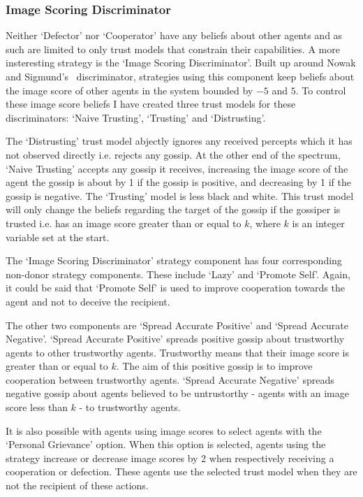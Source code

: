 \documentclass[]{final_report}
\begin{document}
\subsubsection{Image Scoring Discriminator}
Neither `Defector' nor `Cooperator' have any beliefs about other agents and as such are limited to only trust models that constrain their capabilities. A more insteresting strategy is the `Image Scoring Discriminator'. Built up around Nowak and Sigmund's~\cite{evol_indirect_image} discriminator, strategies using this component keep beliefs about the image score of other agents in the system bounded by $-5$ and $5$. To control these image score beliefs I have created three trust models for these discriminators: `Naive Trusting', `Trusting' and `Distrusting'.\par
The `Distrusting' trust model abjectly ignores any received percepts which it has not observed directly i.e. rejects any gossip. At the other end of the spectrum, `Naive Trusting' accepts any gossip it receives, increasing the image score of the agent the gossip is about by 1 if the gossip is positive, and decreasing by 1 if the gossip is negative. The `Trusting' model is less black and white. This trust model will only change the beliefs regarding the target of the gossip if the gossiper is trusted i.e. has an image score greater than or equal to $k$, where $k$ is an integer variable set at the start.\par
The `Image Scoring Discriminator' strategy component has four corresponding non-donor strategy components. These include `Lazy' and `Promote Self'. Again, it could be said that `Promote Self' is used to improve cooperation towards the agent and not to deceive the recipient.\par
The other two components are `Spread Accurate Positive' and `Spread Accurate Negative'. `Spread Accurate Positive' spreads positive gossip about trustworthy agents to other trustworthy agents. Trustworthy means that their image score is greater than or equal to $k$. The aim of this positive gossip is to improve cooperation between trustworthy agents. `Spread Accurate Negative' spreads negative gossip about agents believed to be untrustorthy - agents with an image score less than $k$ - to trustworthy agents.\par 
It is also possible with agents using image scores to select agents with the `Personal Grievance' option. When this option is selected, agents using the strategy increase or decrease image scores by 2 when respectively receiving a cooperation or defection. These agents use the selected trust model when they are not the recipient of these actions.\par
\end{document}
